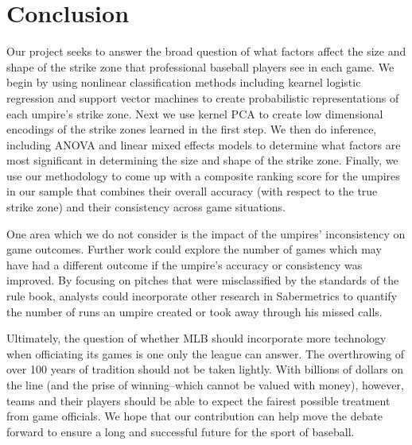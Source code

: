 \documentclass[letterpaper,12pt]{article}
\begin{document}



\section{Conclusion}\label{sec:conclusion}
Our project seeks to answer the broad question of what factors affect the size and shape of the strike zone that professional baseball players see in each game. 
We begin by using nonlinear classification methods including kearnel logistic regression and support vector machines to create probabilistic representations of each umpire's strike zone.
Next we use kernel PCA to create low dimensional encodings of the strike zones learned in the first step.
We then do inference, including ANOVA and linear mixed effects models to determine what factors are most significant in determining the size and shape of the strike zone.
Finally, we use our methodology to come up with a composite ranking score for the umpires in our sample that combines their overall accuracy (with respect to the true strike zone) and their consistency across game situations.

One area which we do not consider is the impact of the umpires' inconsistency on game outcomes. 
Further work could explore the number of games which may have had a different outcome if the umpire's accuracy or consistency was improved. 
By focusing on pitches that were misclassified by the standards of the rule book, analysts could incorporate other research in Sabermetrics to quantify the number of runs an umpire created or took away through his missed calls.

Ultimately, the question of whether MLB should incorporate more technology when officiating its games is one only the league can answer. 
The overthrowing of over 100 years of tradition should not be taken lightly.
With billions of dollars on the line (and the prise of winning--which cannot be valued with money), however, teams and their players should be able to expect the fairest possible treatment from game officials. 
We hope that our contribution can help move the debate forward to ensure a long and successful future for the sport of baseball. 




\end{document}
